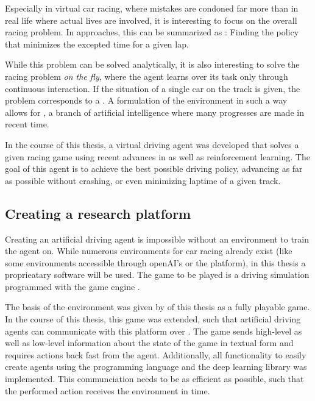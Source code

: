 Especially in virtual car racing, where mistakes are condoned far more than in real life where actual lives are involved, it is interesting to focus on the overall racing problem. In  approaches, this can be summarized as : Finding the policy that minimizes the excepted time for a given lap. 

While this problem can be solved analytically, it is also interesting to solve the racing problem \textit{on the fly}, where the agent learns over its task only through continuous interaction. If the situation of a single car on the track is given, the problem corresponds to a . A formulation of the environment in such a way allows for , a branch of artificial intelligence where many progresses are made in recent time.

In the course of this thesis, a virtual driving agent was developed that solves a given racing game using recent advances in  as well as reinforcement learning. The goal of this agent is to achieve the best possible driving policy, advancing as far as possible without crashing, or even minimizing laptime of a given track. 

\subsection{Creating a research platform}

Creating an artificial driving agent is impossible without an environment to train the agent on. While numerous environments for car racing already exist (like some environments accessible through openAI's  or the  platform), in this thesis a proprieatary software will be used. The game to be played is a driving simulation programmed with the game engine . 

The basis of the environment was given by \leon of this thesis as a fully playable game. In the course of this thesis, this game was extended, such that artificial driving agents can communicate with this platform over . The game sends high-level as well as low-level information about the state of the game in textual form and requires actions back fast from the agent. Additionally, all functionality to easily create agents using the programming language  and the deep learning library  was implemented. This communciation needs to be as efficient as possible, such that the performed action receives the environment in time.

